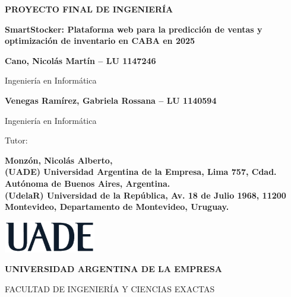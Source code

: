 \begin{titlepage}
    \centering

    {\textbf{\fontsize{18}{20}\selectfont PROYECTO FINAL DE INGENIERÍA} \par}
    \vspace{1.5cm}

    {\textbf{\fontsize{16}{18}\selectfont SmartStocker: Plataforma web para la predicción de ventas y optimización de inventario en CABA en 2025} \par}
    \vspace{0.5cm}

    {\textbf{\fontsize{14}{16}\selectfont Cano, Nicolás Martín -- LU 1147246} \par}
    {\fontsize{14}{16}\selectfont Ingeniería en Informática \par}
    \vspace{1cm}

    {\textbf{\fontsize{14}{16}\selectfont Venegas Ramírez, Gabriela Rossana -- LU 1140594} \par}
    {\fontsize{14}{16}\selectfont Ingeniería en Informática \par}
    \vspace{1.5cm}

    {\fontsize{14}{16}\selectfont Tutor: \par}
    {\textbf{\fontsize{14}{16}\selectfont Monzón, Nicolás Alberto, 
        \\ (UADE) Universidad Argentina de la Empresa, Lima 757, Cdad. Autónoma de Buenos Aires, Argentina.
        \\ (UdelaR) Universidad de la República, Av. 18 de Julio 1968, 11200 Montevideo, Departamento de Montevideo, Uruguay.
    } \par}
    \vspace{3cm}

	{\textbf{\fontsize{14}{16}\selectfont \the\year} \par}
    \vspace{2cm}

    \includegraphics[width=0.30\textwidth]{./images/UADE}\par \vspace{1cm}
    {\textbf{\fontsize{14}{16}\selectfont UNIVERSIDAD ARGENTINA DE LA EMPRESA} \par}
    {\fontsize{14}{16}\selectfont FACULTAD DE INGENIERÍA Y CIENCIAS EXACTAS \par}
\end{titlepage}